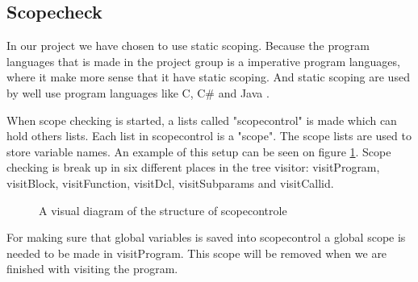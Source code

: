 \subsection{Scopecheck}
\label{sec:scopecheck}
In our project we have chosen to use static scoping. Because the program languages that is made in the project group is a imperative program languages, where it make more sense that it have static scoping. And static scoping are used by well use program languages like C, C\# and Java \citep{ProgrammingCommunityIndex}.


When scope checking is started, a lists called "scopecontrol" is made which can hold others lists. Each list in scopecontrol is a "scope". The scope lists are used to store variable names. An example of this setup can be seen on figure \ref{fig:scopediagram}. Scope checking is break up in six different places in the tree visitor: visitProgram, visitBlock, visitFunction, visitDcl, visitSubparams and visitCallid.

\begin{figure}[H]

\centering
{}
\caption{A visual diagram of the structure of scopecontrole}
\label{fig:scopediagram}
\end{figure}

For making sure that global variables is saved into scopecontrol a global scope is needed to be made in visitProgram. This scope will be removed when we are finished with visiting the program.

